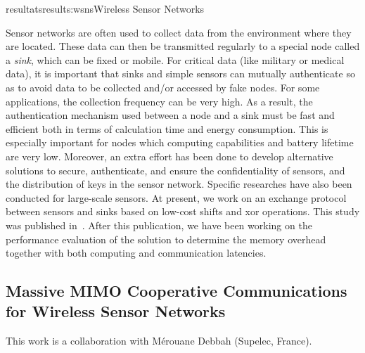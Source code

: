 \documentclass{ra2016}
\begin{document}
\begin{module}{resultats}{results:wsns}{Wireless Sensor Networks}
\begin{participants}
\end{participants}

Sensor networks are often used to collect data from the environment where they are located.
These data can then be transmitted regularly to a special node called a {\em sink}, which can be fixed or mobile.
For critical data (like military or medical data), it is important that sinks and simple sensors can mutually authenticate so as to avoid data to be collected and/or accessed by fake nodes.
For some applications, the collection frequency can be very high.
As a result, the authentication mechanism used between a node and a sink must be fast and efficient both in terms of calculation time and energy consumption.
This is especially important for nodes which computing capabilities and battery lifetime are very low.
Moreover, an extra effort has been done to develop alternative solutions to secure, authenticate, and ensure the confidentiality of sensors, and the distribution of keys in the sensor network.
Specific researches have also been conducted for large-scale sensors.
At present, we work on an exchange protocol between sensors and sinks based on low-cost shifts and xor operations.
This study was published in~\cite{boumerdassi:hal-01251917}.
After this publication, we have been working on the performance evaluation of the solution to determine the memory overhead together with both computing and communication latencies.

\subsection{Massive MIMO Cooperative Communications for Wireless Sensor Networks}

\begin{participants}
\end{participants}

This work is a collaboration with M\'erouane Debbah (Supelec, France).


\end{module}
\end{document}
